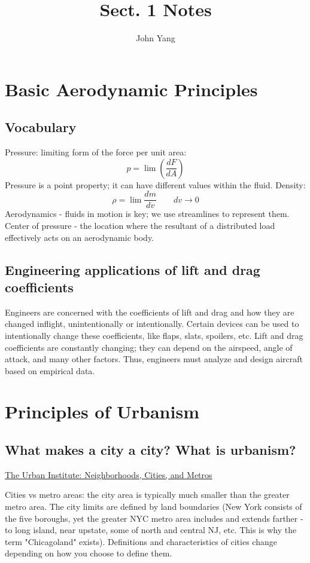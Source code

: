 \documentclass{article}
\title{Sect. 1 Notes} %
\author{John Yang}
\begin{document}
    \maketitle
    \tableofcontents
    \section{Basic Aerodynamic Principles}
    \subsection{Vocabulary}
    \begin{outline}
        \1 Pressure: limiting form of the force per unit area: \[p=\lim\left(\dfrac{dF}{dA}\right)\]
            \2 Pressure is a point property; it can have different values within the fluid. 
        \1 Density: \[\rho=\lim\dfrac{dm}{dv}\qquad dv\to0\]
        \1 Aerodynamics - fluids in motion is key; we use streamlines to represent them. 
        \1 Center of pressure - the location where the resultant of a distributed load effectively acts on an aerodynamic body. 

    \end{outline}
    \subsection{Engineering applications of lift and drag coefficients}
    \begin{outline}
        \1 Engineers are concerned with the coefficients of lift and drag and how they are changed inflight, unintentionally or intentionally. 
        \1 Certain devices can be used to intentionally change these coefficients, like flaps, slats, spoilers, etc. 
        \1 Lift and drag coefficients are constantly changing; they can depend on the airspeed, angle of attack, and many other factors. Thus, engineers must analyze and design aircraft based on empirical data. 

    \end{outline}
    \section{Principles of Urbanism}
        \subsection{What makes a city a city? What is urbanism?}
        \small{\href{https://www.urban.org/urban-wire/what-defines-city}{The Urban Institute: Neighborhoods, Cities, and Metros}}
        \normalsize
        \begin{outline}
            \1 Cities vs metro areas: the city area is typically much smaller than the greater metro area. The city limits are defined by land boundaries (New York consists of the five boroughs, yet the greater NYC metro area includes and extends farther - to long island, near upstate, some of north and central NJ, etc. This is why the term "Chicagoland" exists). 
            \1 Definitions and characteristics of cities change depending on how you choose to define them. 
        \end{outline}
\end{document}
